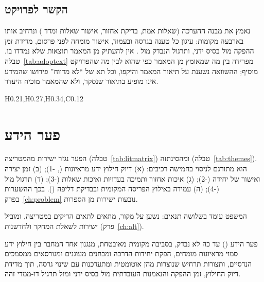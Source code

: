 \subsection*{הקשר לפרויקט}
נאמץ את מבנה ההערכה (שאלות אמת, בדיקת אחזור, אישור שאלות ומדד ) ונרחיב אותו בארבעה מקומות: עיגון כל טענה בגרסה
ובעמוד, אישור מומחה לפני פרסום, מדידת זמן ההפקה מול בסיס ידני, ותרגול  הנבדק מול . אין להעתיק
מן המאמר תוצאות שלא נמדדו בו.
טבלה~\ref{tab:adoptext} מפרידה בין מה שמאומץ מן המאמר כפי שהוא לבין מה שהפרויקט מוסיף; ההשוואה נשענת על תיאור המאמר והיקפו, וכל תא של “לא מדווח” פירושו
שהמידע אינו מופיע בתיאור שנסקר, ולא שהמאמר מוכיח היעדר.
\begin{table}[!htbp]
\centering
\caption{מאמר הדגל מול הפרויקט: מה מאומץ ומה מורחב}\label{tab:adoptext}
\begin{pctable}{H{0.21},H{0.27},H{0.34},C{0.12}}
\end{pctable}
\end{table}

\section{פער הידע}\label{sec:gap}
הפער נגזר ישירות מהמטריצה (טבלה~\ref{tab:litmatrix}) ומהסינתזה (טבלה~\ref{tab:themes}). הוא מתורגם לניסוי בחמישה רכיבים:
(א) דיוק חילוץ ידע מראיונות (, \hyp{1}); (ב) זמן יצירה ואישור של יחידה (\hyp{2}); (ג) איכות אחזור ותמיכה בעדויות
ואיכות שאלות (\hyp{3}); (ד) תרגול  מול  (\hyp{4}); (ה) עמידה באילוץ הפריסה המקומית ובבדיקת דליפה
(). בכך ההשערות בפרק~\ref{ch:problem} נובעות ישירות מן הספרות.
\begin{pcguide}[בדיקה]
המשפט עומד בשלושה תנאים: נשען על מקור, מתאים לתאים הריקים במטריצה, ומוביל ישירות לשאלת המחקר
ולחדשנות (פרק~\ref{ch:alt}).
\end{pcguide}
\begin{pcbox}[pcBad]{פער הידע ()}
עד כה לא נבדק, בסביבה מקומית מאובטחת, מנגנון אחד המחבר בין חילוץ ידע סמוי מראיונות מומחים, הפקת יחידות הדרכה
ומבחנים מעוגנים ומגורסאים ממסמכים הנדסיים, ותצורות תרחיש \threeDadj{} שנוצרות מהן אוטומטית ומתעדכנות עם שינוי גרסה, תוך מדידת
דיוק החילוץ, זמן ההפקה והנאמנות העובדתית מול בסיס ידני ומול תרגיל \mbox{דו-ממדי} זהה.
\end{pcbox}
